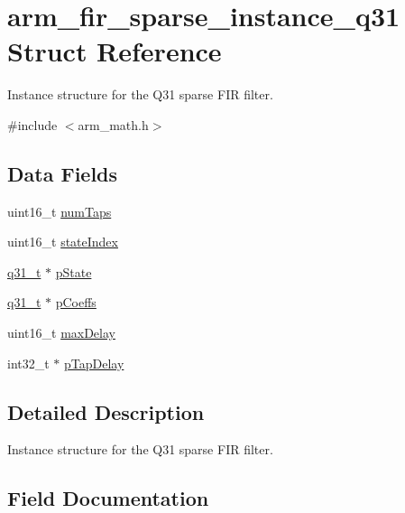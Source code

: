 \hypertarget{structarm__fir__sparse__instance__q31}{}\section{arm\+\_\+fir\+\_\+sparse\+\_\+instance\+\_\+q31 Struct Reference}
\label{structarm__fir__sparse__instance__q31}


Instance structure for the Q31 sparse F\+IR filter.  




{\ttfamily \#include $<$arm\+\_\+math.\+h$>$}

\subsection*{Data Fields}
\begin{DoxyCompactItemize}
\item 
uint16\+\_\+t \mbox{\hyperlink{structarm__fir__sparse__instance__q31_a751941891e47f522a7f5375fe8990aac}{num\+Taps}}
\item 
uint16\+\_\+t \mbox{\hyperlink{structarm__fir__sparse__instance__q31_a566a0cb53437e48b9a3bf18e5b03d8aa}{state\+Index}}
\item 
\mbox{\hyperlink{arm__math_8h_adc89a3547f5324b7b3b95adec3806bc0}{q31\+\_\+t}} $\ast$ \mbox{\hyperlink{structarm__fir__sparse__instance__q31_adee4ba3ee8869865af7d8fa08ca913d6}{p\+State}}
\item 
\mbox{\hyperlink{arm__math_8h_adc89a3547f5324b7b3b95adec3806bc0}{q31\+\_\+t}} $\ast$ \mbox{\hyperlink{structarm__fir__sparse__instance__q31_a68888e36167d81cb7836db10367a1682}{p\+Coeffs}}
\item 
uint16\+\_\+t \mbox{\hyperlink{structarm__fir__sparse__instance__q31_ab25f4ee7550e6d92acff77ada283733f}{max\+Delay}}
\item 
int32\+\_\+t $\ast$ \mbox{\hyperlink{structarm__fir__sparse__instance__q31_adec00b3793ab4f08edfeb4ea6a9eb6e6}{p\+Tap\+Delay}}
\end{DoxyCompactItemize}


\subsection{Detailed Description}
Instance structure for the Q31 sparse F\+IR filter. 

\subsection{Field Documentation}
\mbox{\label{structarm__fir__sparse__instance__q31_ab25f4ee7550e6d92acff77ada283733f}} 
